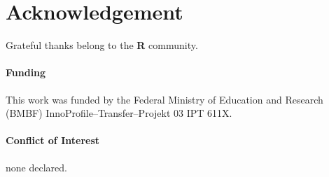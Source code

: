 \documentclass{bioinfo}
\begin{document}
\section*{Acknowledgement}

Grateful thanks belong to the \textbf{R} community.

\paragraph{Funding\textcolon} This work was funded by the Federal Ministry of Education and Research (BMBF)
 InnoProfile--Transfer--Projekt 03 IPT 611X.

\paragraph{Conflict of Interest\textcolon} none declared.

%
%
%
%
%
%

%

\end{document}
